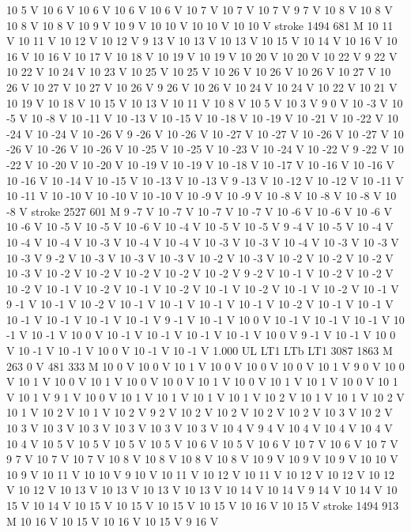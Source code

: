 {{10 5 V
10 6 V
10 6 V
10 6 V
10 6 V
10 7 V
10 7 V
10 7 V
9 7 V
10 8 V
10 8 V
10 8 V
10 8 V
10 9 V
10 9 V
10 10 V
10 10 V
10 10 V
stroke
1494 681 M
10 11 V
10 11 V
10 12 V
10 12 V
9 13 V
10 13 V
10 13 V
10 15 V
10 14 V
10 16 V
10 16 V
10 16 V
10 17 V
10 18 V
10 19 V
10 19 V
10 20 V
10 20 V
10 22 V
9 22 V
10 22 V
10 24 V
10 23 V
10 25 V
10 25 V
10 26 V
10 26 V
10 26 V
10 27 V
10 26 V
10 27 V
10 27 V
10 26 V
9 26 V
10 26 V
10 24 V
10 24 V
10 22 V
10 21 V
10 19 V
10 18 V
10 15 V
10 13 V
10 11 V
10 8 V
10 5 V
10 3 V
9 0 V
10 -3 V
10 -5 V
10 -8 V
10 -11 V
10 -13 V
10 -15 V
10 -18 V
10 -19 V
10 -21 V
10 -22 V
10 -24 V
10 -24 V
10 -26 V
9 -26 V
10 -26 V
10 -27 V
10 -27 V
10 -26 V
10 -27 V
10 -26 V
10 -26 V
10 -26 V
10 -25 V
10 -25 V
10 -23 V
10 -24 V
10 -22 V
9 -22 V
10 -22 V
10 -20 V
10 -20 V
10 -19 V
10 -19 V
10 -18 V
10 -17 V
10 -16 V
10 -16 V
10 -16 V
10 -14 V
10 -15 V
10 -13 V
10 -13 V
9 -13 V
10 -12 V
10 -12 V
10 -11 V
10 -11 V
10 -10 V
10 -10 V
10 -10 V
10 -9 V
10 -9 V
10 -8 V
10 -8 V
10 -8 V
10 -8 V
stroke
2527 601 M
9 -7 V
10 -7 V
10 -7 V
10 -7 V
10 -6 V
10 -6 V
10 -6 V
10 -6 V
10 -5 V
10 -5 V
10 -6 V
10 -4 V
10 -5 V
10 -5 V
9 -4 V
10 -5 V
10 -4 V
10 -4 V
10 -4 V
10 -3 V
10 -4 V
10 -4 V
10 -3 V
10 -3 V
10 -4 V
10 -3 V
10 -3 V
10 -3 V
9 -2 V
10 -3 V
10 -3 V
10 -3 V
10 -2 V
10 -3 V
10 -2 V
10 -2 V
10 -2 V
10 -3 V
10 -2 V
10 -2 V
10 -2 V
10 -2 V
10 -2 V
9 -2 V
10 -1 V
10 -2 V
10 -2 V
10 -2 V
10 -1 V
10 -2 V
10 -1 V
10 -2 V
10 -1 V
10 -2 V
10 -1 V
10 -2 V
10 -1 V
9 -1 V
10 -1 V
10 -2 V
10 -1 V
10 -1 V
10 -1 V
10 -1 V
10 -2 V
10 -1 V
10 -1 V
10 -1 V
10 -1 V
10 -1 V
10 -1 V
9 -1 V
10 -1 V
10 0 V
10 -1 V
10 -1 V
10 -1 V
10 -1 V
10 -1 V
10 0 V
10 -1 V
10 -1 V
10 -1 V
10 -1 V
10 0 V
9 -1 V
10 -1 V
10 0 V
10 -1 V
10 -1 V
10 0 V
10 -1 V
10 -1 V
1.000 UL
LT1
LTb
LT1
3087 1863 M
263 0 V
481 333 M
10 0 V
10 0 V
10 1 V
10 0 V
10 0 V
10 0 V
10 1 V
9 0 V
10 0 V
10 1 V
10 0 V
10 1 V
10 0 V
10 0 V
10 1 V
10 0 V
10 1 V
10 1 V
10 0 V
10 1 V
10 1 V
9 1 V
10 0 V
10 1 V
10 1 V
10 1 V
10 1 V
10 2 V
10 1 V
10 1 V
10 2 V
10 1 V
10 2 V
10 1 V
10 2 V
9 2 V
10 2 V
10 2 V
10 2 V
10 2 V
10 3 V
10 2 V
10 3 V
10 3 V
10 3 V
10 3 V
10 3 V
10 3 V
10 4 V
9 4 V
10 4 V
10 4 V
10 4 V
10 4 V
10 5 V
10 5 V
10 5 V
10 5 V
10 6 V
10 5 V
10 6 V
10 7 V
10 6 V
10 7 V
9 7 V
10 7 V
10 7 V
10 8 V
10 8 V
10 8 V
10 8 V
10 9 V
10 9 V
10 9 V
10 10 V
10 9 V
10 11 V
10 10 V
9 10 V
10 11 V
10 12 V
10 11 V
10 12 V
10 12 V
10 12 V
10 12 V
10 13 V
10 13 V
10 13 V
10 13 V
10 14 V
10 14 V
9 14 V
10 14 V
10 15 V
10 14 V
10 15 V
10 15 V
10 15 V
10 15 V
10 16 V
10 15 V
stroke
1494 913 M
10 16 V
10 15 V
10 16 V
10 15 V
9 16 V
}}
